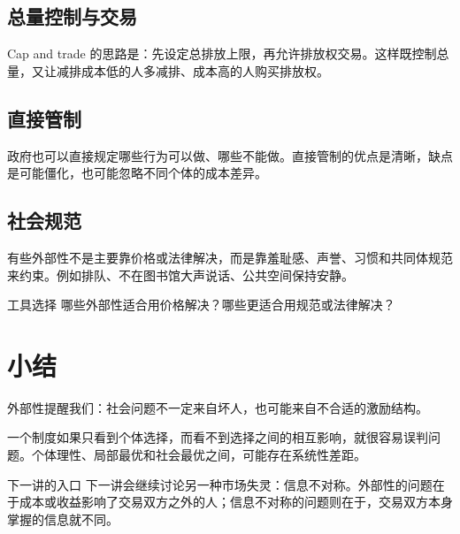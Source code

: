 \documentclass[10pt,a4paper]{ctexart}
\begin{document}
\subsection{总量控制与交易}

Cap and trade 的思路是：先设定总排放上限，再允许排放权交易。这样既控制总量，又让减排成本低的人多减排、成本高的人购买排放权。

\subsection{直接管制}

政府也可以直接规定哪些行为可以做、哪些不能做。直接管制的优点是清晰，缺点是可能僵化，也可能忽略不同个体的成本差异。

\subsection{社会规范}

有些外部性不是主要靠价格或法律解决，而是靠羞耻感、声誉、习惯和共同体规范来约束。例如排队、不在图书馆大声说话、公共空间保持安静。

\begin{discussionbox}{工具选择}
哪些外部性适合用价格解决？哪些更适合用规范或法律解决？
\end{discussionbox}

\section{小结}

外部性提醒我们：社会问题不一定来自坏人，也可能来自不合适的激励结构。

一个制度如果只看到个体选择，而看不到选择之间的相互影响，就很容易误判问题。个体理性、局部最优和社会最优之间，可能存在系统性差距。

\begin{insightbox}{下一讲的入口}
下一讲会继续讨论另一种市场失灵：信息不对称。外部性的问题在于成本或收益影响了交易双方之外的人；信息不对称的问题则在于，交易双方本身掌握的信息就不同。
\end{insightbox}
\end{document}
